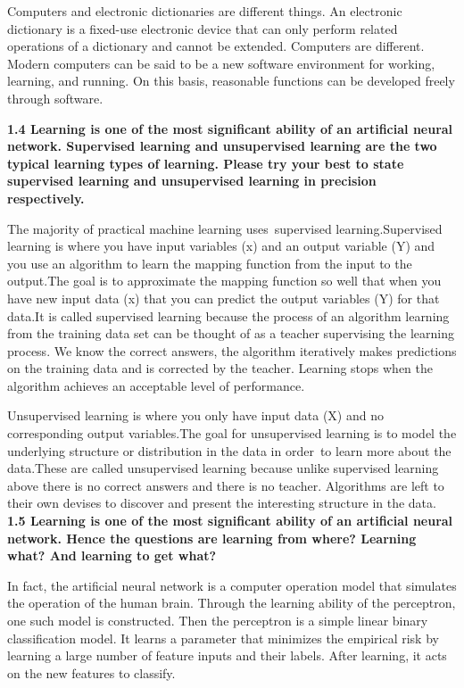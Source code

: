 \noindent Computers and electronic dictionaries are different things. An electronic dictionary is a fixed-use electronic device that can only perform related operations of a dictionary and cannot be extended. Computers are different. Modern computers can be said to be a new software environment for working, learning, and running. On this basis, reasonable functions can be developed freely through software.

\noindent\textbf{1.4 Learning is one of the most significant ability of an artificial neural network. Supervised
learning and unsupervised learning are the two typical learning types of learning. Please try
your best to state supervised learning and unsupervised learning in precision respectively.}

\noindent The majority of practical machine learning uses supervised learning.Supervised learning is where you have input variables (x) and an output variable (Y) and you use an algorithm to learn the mapping function from the input to the output.The goal is to approximate the mapping function so well that when you have new input data (x) that you can predict the output variables (Y) for that data.It is called supervised learning because the process of an algorithm learning from the training data set can be thought of as a teacher supervising the learning process. We know the correct answers, the algorithm iteratively makes predictions on the training data and is corrected by the teacher. Learning stops when the algorithm achieves an acceptable level of performance.

\noindent Unsupervised learning is where you only have input data (X) and no corresponding output variables.The goal for unsupervised learning is to model the underlying structure or distribution in the data in order to learn more about the data.These are called unsupervised learning because unlike supervised learning above there is no correct answers and there is no teacher. Algorithms are left to their own devises to discover and present the interesting structure in the data.
\newpage
\noindent\textbf{1.5 Learning is one of the most significant ability of an artificial neural network. Hence the
questions are learning from where? Learning what? And learning to get what?}

\noindent In fact, the artificial neural network is a computer operation model that simulates the operation of the human brain. Through the learning ability of the perceptron, one such model is constructed. Then the perceptron is a simple linear binary classification model. It learns a parameter that minimizes the empirical risk by learning a large number of feature inputs and their labels. After learning, it acts on the new features to classify.

